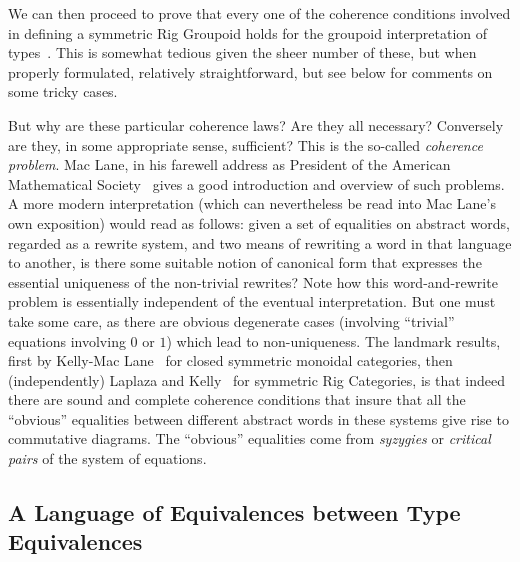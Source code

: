 \documentclass{article}
\begin{document}
We can then proceed to prove that every one of the coherence conditions
involved in defining a symmetric Rig Groupoid holds for the groupoid
interpretation of types~\cite{Carette2016}.  This is somewhat tedious
given the sheer number of these, but when properly formulated,
relatively straightforward, but see below for comments on some
tricky cases.

But why are these particular coherence laws? Are they all necessary?
Conversely are they, in some appropriate sense, sufficient? This is
the so-called \emph{coherence problem}. Mac Lane, in his farewell address
as President of the American Mathematical Society~\cite{MacLane1976} gives
a good introduction and overview of such problems.  A more modern
interpretation (which can nevertheless be read into Mac Lane's own
exposition) would read as follows: given a set of equalities on abstract
words, regarded as a rewrite system, and two means of rewriting a word
in that language to another, is there some suitable notion of canonical
form that expresses the essential uniqueness of the non-trivial
rewrites?  Note how this word-and-rewrite problem is essentially
independent of the eventual interpretation. But one must take some care,
as there are obvious degenerate cases (involving ``trivial'' equations
involving $0$ or $1$) which lead to non-uniqueness. The landmark
results, first by Kelly-Mac Lane~\cite{KELLY197197} for closed
symmetric monoidal categories, then (independently) Laplaza and
Kelly~\cite{laplaza72,kelly74} for symmetric Rig Categories, is
that indeed there are sound and complete coherence conditions that
insure that all the ``obvious'' equalities between different abstract
words in these systems give rise to commutative diagrams. The
``obvious'' equalities come from \emph{syzygies} or
\emph{critical pairs} of the system of equations.

\subsection{A Language of Equivalences between Type Equivalences}
\end{document}
